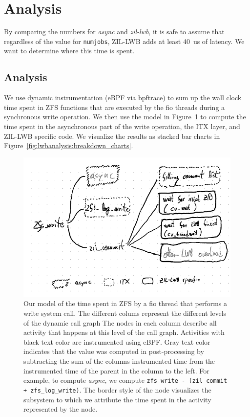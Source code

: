 \documentclass[12pt,a4paper,twoside]{book}
\begin{document}
\section{Analysis}

By comparing the numbers for \textit{async} and \textit{zil-lwb}, it is safe to assume that regardless of the value for \lstinline{numjobs}, ZIL-LWB adds at least 40~us of latency.
We want to determine where this time is spent.

\subsection{Analysis}\label{ch:lwb_analysis:breakdown}

We use dynamic instrumentation (eBPF via bpftrace) to sum up the wall clock time spent in ZFS functions that are executed by the fio threads during a synchronous write operation.
We then use the model in Figure~\ref{fig:lwbanalysis:breakdown_model} to compute the time spent in the asynchronous part of the write operation, the ITX layer, and ZIL-LWB specific code.
We visualize the results as stacked bar charts in Figure~\ref{fig:lwbanalysis:breakdown_charts}.

\begin{figure}[H]
    \centering
    \includegraphics{fig/zil_lwb_latency_analysis__breakdown}
    \caption{Our model of the time spent in ZFS by a fio thread that performs a write system call.
    The different colums represent the different levels of the dynamic call graph
    The nodes in each column describe all activity that happens at this level of the call graph.
    Activities with black text color are instrumented using eBPF.
    Gray text color indicates that the value was computed in post-processing by subtracting the sum of the columns instrumented time from the instrumented time of the parent in the column to the left.
    For example, to compute \textit{async}, we compute \lstinline{zfs_write - (zil_commit + zfs_log_write)}.
    The border style of the node visualizes the subsystem to which we attribute the time spent in the activity represented by the node.
    }
    \label{fig:lwbanalysis:breakdown_model}
\end{figure}
\end{document}
